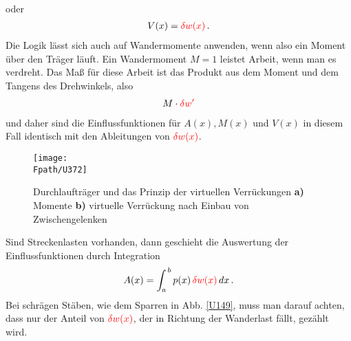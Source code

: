 {{{{\begin{align}
\end{align}
oder
\begin{align}
V(x) = \textcolor{red}{\delta w(x)}\,.
\end{align}
Die Logik l\"{a}sst sich auch auf Wandermomente anwenden, wenn also ein Moment \"{u}ber den Tr\"{a}ger l\"{a}uft.
Ein Wandermoment $M = 1$ leistet Arbeit, wenn man es verdreht. Das Ma{\ss} f\"{u}r diese Arbeit ist das Produkt aus dem Moment und dem Tangens des Drehwinkels, also
\begin{align}
M \cdot\textcolor{red}{\delta w'}
\end{align}
und daher sind die Einflussfunktionen f\"{u}r $A(x), M(x)$ und $V(x)$ in diesem Fall identisch mit den Ableitungen von $\textcolor{red}{\delta w(x)}$.
\begin{figure}[tbp]
\centering
\if {} \sidecaption \fi
\texttt{[image: \\Fpath/U372]}
\caption{Durchlauftr\"{a}ger und das Prinzip der virtuellen Verr\"{u}ckungen  \textbf{ a)} Momente  \textbf{b)} virtuelle Verr\"{u}ckung nach Einbau von Zwischengelenken } \label{U372}
\end{figure}%
Sind Streckenlasten vorhanden, dann geschieht die Auswertung der Einflussfunktionen durch Integration
\begin{align}
A(x) = \int_a^{\,b} p(x)\,\textcolor{red}{\delta w(x)}\,dx\,.
\end{align}
Bei schr\"{a}gen St\"{a}ben, wie dem Sparren in Abb. \ref{U149}, muss man darauf achten, dass nur der Anteil von $\textcolor{red}{\delta w(x)}$, der in Richtung der Wanderlast f\"{a}llt, gez\"{a}hlt wird.

}}}}
